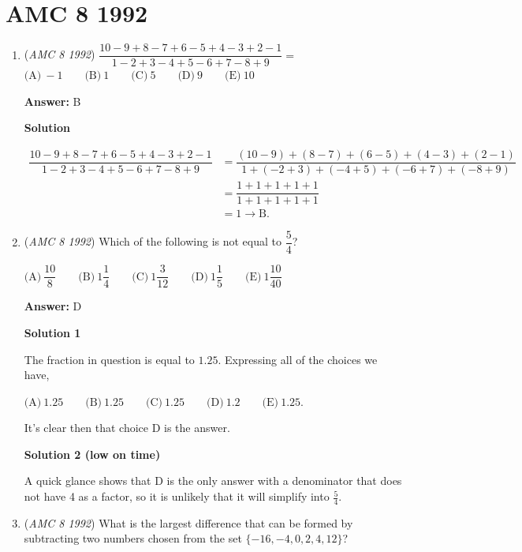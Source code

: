 \section{AMC 8 1992}
        \begin{enumerate}
        	\item (\textit{AMC 8 1992}) $\dfrac{10-9+8-7+6-5+4-3+2-1}{1-2+3-4+5-6+7-8+9}=$
$\text{(A)}\ -1 \qquad \text{(B)}\ 1 \qquad \text{(C)}\ 5 \qquad \text{(D)}\ 9 \qquad \text{(E)}\ 10$

 \textbf{Answer: }B



\textbf{Solution}


 \begin{align*} \dfrac{10-9+8-7+6-5+4-3+2-1}{1-2+3-4+5-6+7-8+9} &= \dfrac{(10-9)+(8-7)+(6-5)+(4-3)+(2-1)}{1+(-2+3)+(-4+5)+(-6+7)+(-8+9)} \\ &= \dfrac{1+1+1+1+1}{1+1+1+1+1} \\ &= 1 \rightarrow \boxed{\text{B}}. \end{align*}




	\item (\textit{AMC 8 1992}) Which of the following is not equal to $\dfrac{5}{4}$?


 $\text{(A)}\ \dfrac{10}{8} \qquad \text{(B)}\ 1\dfrac{1}{4} \qquad \text{(C)}\ 1\dfrac{3}{12} \qquad \text{(D)}\ 1\dfrac{1}{5} \qquad \text{(E)}\ 1\dfrac{10}{40}$

 \textbf{Answer: }D



\textbf{Solution 1}

The fraction in question is equal to $1.25$.  Expressing all of the choices we have,

 $\text{(A)}\ 1.25 \qquad \text{(B)}\ 1.25 \qquad \text{(C)}\ 1.25 \qquad \text{(D)}\ 1.2 \qquad \text{(E)}\ 1.25$.

 It's clear then that choice $\boxed{\text{D}}$ is the answer.

 



\textbf{Solution 2 (low on time)}

A quick glance shows that $\boxed{\text{D}}$ is the only answer with a denominator that does not have 4 as a factor, so it is unlikely that it will simplify into $\frac{5}{4}$.

 


	\item (\textit{AMC 8 1992}) What is the largest difference that can be formed by subtracting two numbers chosen from the set $\{ -16,-4,0,2,4,12 \}$?



\end{enumerate}
